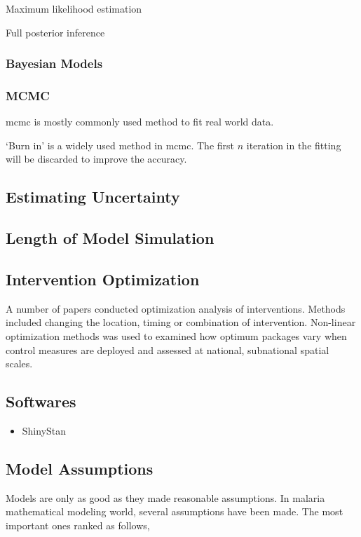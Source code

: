 \documentclass[a4paper, 12pt, twoside]{article}
\begin{document}
Maximum likelihood estimation

Full posterior inference

\subsubsection{Bayesian Models}

\subsubsection{MCMC}

\gls{mcmc} is mostly commonly used method to fit real world data.

`Burn in' is a widely used method in \gls{mcmc}. The first $n$ iteration in the fitting will be discarded to improve the accuracy.

\subsection{Estimating Uncertainty}

\subsection{Length of Model Simulation}

\subsection{Intervention Optimization}
A number of papers conducted optimization analysis of interventions.
Methods included changing the location, timing or combination of intervention.
Non-linear optimization methods\cite{Walker2016} was used to examined how optimum packages vary when control measures are deployed and assessed at national, subnational spatial scales.

\subsection{Softwares}

\begin{itemize}
	\item ShinyStan
\end{itemize}

\subsection{Model Assumptions}
Models are only as good as they made reasonable assumptions. In malaria mathematical modeling world, several assumptions have been made. The most important ones ranked as follows,
\end{document}
